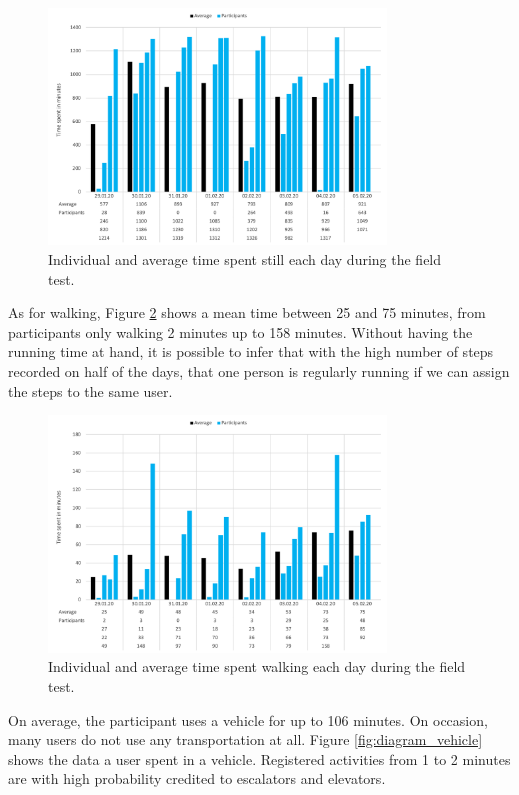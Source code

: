 \begin{figure}[htbp]
  \centering
  \includegraphics[width=0.8\textwidth]{figures/diagram_still}
  \caption{Individual and average time spent still each day during the field test.} \label{fig:diagram_still}
\end{figure}

As for walking, Figure \ref{fig:diagram_walking} shows a mean time between 25 and 75 minutes, from participants only walking 2 minutes up to 158 minutes. Without having the running time at hand, it is possible to infer that with the high number of steps recorded on half of the days, that one person is regularly running if we can assign the steps to the same user.

\begin{figure}[htbp]
  \centering
  \includegraphics[width=0.8\textwidth]{figures/diagram_walking.png}
  \caption{Individual and average time spent walking each day during the field test.} \label{fig:diagram_walking}
\end{figure}

On average, the participant uses a vehicle for up to 106 minutes. On occasion, many users do not use any transportation at all. Figure \ref{fig:diagram_vehicle} shows the data a user spent in a vehicle. Registered activities from 1 to 2 minutes are with high probability credited to escalators and elevators.  

